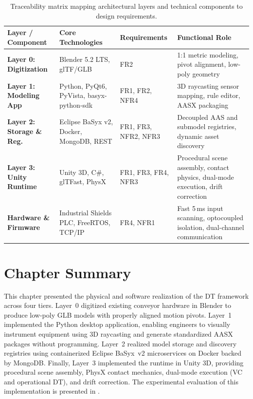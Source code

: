 \begin{landscape}
\vspace*{\fill}
\begin{table}[htbp]
    \centering
    \caption{Traceability matrix mapping architectural layers and technical components to design requirements.}
    \label{tab:impl_traceability_matrix}
    \small
    \renewcommand{\arraystretch}{1.4}
    \setlength{\tabcolsep}{8pt}
    \begin{tabularx}{\linewidth}{@{}p{4.0cm} p{5.5cm} p{2.8cm} X@{}}
        \toprule
        \textbf{Layer / Component} & \textbf{Core Technologies} & \textbf{Requirements} & \textbf{Functional Role} \\ \midrule
        \textbf{Layer 0: Digitization} & Blender 5.2 LTS, \gls{glTF}/\gls{GLB} & FR2 & 1:1 metric modeling, pivot alignment, low-poly geometry \\ \addlinespace[4pt]
        \textbf{Layer 1: Modeling App} & Python, PyQt6, PyVista, basyx-python-sdk & FR1, FR2, NFR4 & 3D raycasting sensor mapping, rule editor, \gls{AASX} packaging \\ \addlinespace[4pt]
        \textbf{Layer 2: Storage \& Reg.} & Eclipse BaSyx v2, Docker, MongoDB, \gls{REST} & FR1, FR3, NFR2, NFR3 & Decoupled \gls{AAS} and submodel registries, dynamic asset discovery \\ \addlinespace[4pt]
        \textbf{Layer 3: Unity Runtime} & Unity 3D, C\#, glTFast, PhysX & FR1, FR3, FR4, NFR3 & Procedural scene assembly, contact physics, dual-mode execution, drift correction \\ \addlinespace[4pt]
        \textbf{Hardware \& Firmware} & Industrial Shields \gls{PLC}, FreeRTOS, \gls{TCP}/\gls{IP} & FR4, NFR1 & Fast 5\,ms input scanning, optocoupled isolation, dual-channel communication \\ \bottomrule
    \end{tabularx}
\end{table}
\vspace*{\fill}
\end{landscape}

\section{Chapter Summary}
\label{sec:impl_summary}

This chapter presented the physical and software realization of the \gls{DT} framework across four tiers. Layer~0 digitized existing conveyor hardware in Blender to produce low-poly \gls{GLB} models with properly aligned motion pivots. Layer~1 implemented the Python desktop application, enabling engineers to visually instrument equipment using 3D raycasting and generate standardized \gls{AASX} packages without programming. Layer~2 realized model storage and discovery registries using containerized Eclipse BaSyx~v2 microservices on Docker backed by MongoDB. Finally, Layer~3 implemented the runtime in Unity 3D, providing procedural scene assembly, PhysX contact mechanics, dual-mode execution (\gls{VC} and operational \gls{DT}), and drift correction. The experimental evaluation of this implementation is presented in .

